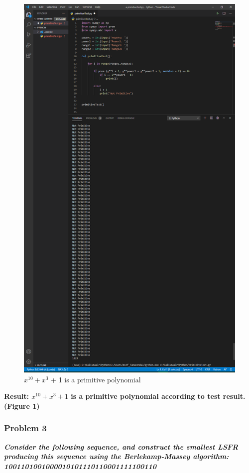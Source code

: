 \documentclass[a4paper, 11pt]{article}
\begin{document}
\begin{figure}[!h]
    \includegraphics[width=\linewidth]{PrimitiveTest.png}
    \caption{$x^{10} + x^{3}$ + 1 is a primitive polynomial}
    \label{fig:boat1}
\end{figure}
\textbf{Result: $x^{10} + x^3 + 1$ is a primitive polynomial according to test result.(Figure 1)} 

\newpage\subsubsection*{Problem 3}
\textbf{\textit{Consider the following sequence, and construct the smallest LSFR producing this sequence
using the Berlekamp-Massey algorithm: 1001101001000010101110110001111100110}}
\end{document}
